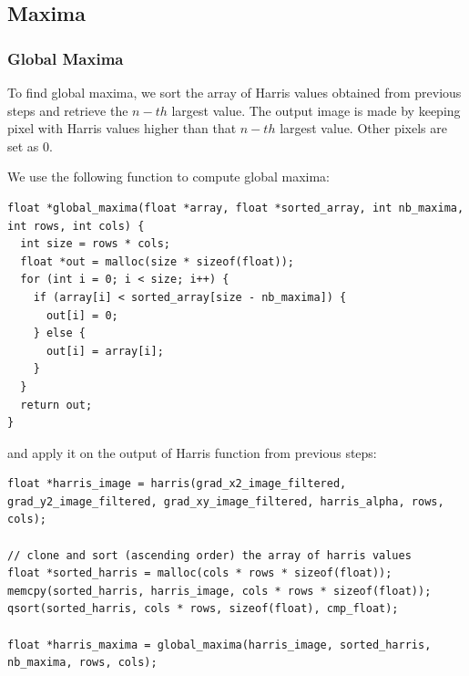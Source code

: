 \documentclass[a4paper, 10pt]{article}
\begin{document}
\subsection{Maxima}
\subsubsection{Global Maxima}
To find global maxima, we sort the array of Harris values obtained from previous steps and retrieve the $n-th$ largest value. The output image is made by keeping pixel with Harris values higher than that $n-th$ largest value. Other pixels are set as 0.

We use the following function to compute global maxima:
\begin{lstlisting}[frame=single]
float *global_maxima(float *array, float *sorted_array, int nb_maxima, int rows, int cols) {
  int size = rows * cols;
  float *out = malloc(size * sizeof(float));
  for (int i = 0; i < size; i++) {
    if (array[i] < sorted_array[size - nb_maxima]) {
      out[i] = 0;
    } else {
      out[i] = array[i];
    }
  }
  return out;
}
\end{lstlisting}

and apply it on the output of Harris function from previous steps:
\begin{lstlisting}[frame=single]
float *harris_image = harris(grad_x2_image_filtered, grad_y2_image_filtered, grad_xy_image_filtered, harris_alpha, rows, cols);

// clone and sort (ascending order) the array of harris values
float *sorted_harris = malloc(cols * rows * sizeof(float));
memcpy(sorted_harris, harris_image, cols * rows * sizeof(float));
qsort(sorted_harris, cols * rows, sizeof(float), cmp_float);

float *harris_maxima = global_maxima(harris_image, sorted_harris, nb_maxima, rows, cols);
\end{lstlisting}
\end{document}
